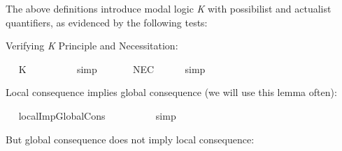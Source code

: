 \begin{isabellebody}
\isamarkuptrue%
%
\begin{isamarkuptext}%
The above definitions introduce modal logic \emph{K} with possibilist and actualist quantifiers,
as evidenced by the following tests:%
\end{isamarkuptext}\isamarkuptrue%
%
\begin{isamarkuptext}%
Verifying \emph{K} Principle and Necessitation:%
\end{isamarkuptext}\isamarkuptrue%
\ \isamarkupfalse%
\ K{\isacharcolon}\ {\isachardoublequoteopen}{\isasymlfloor}{\isacharparenleft}\isactrlbold {\isasymbox}{\isacharparenleft}{\isasymphi}\ \isactrlbold {\isasymrightarrow}\ {\isasympsi}{\isacharparenright}{\isacharparenright}\ \isactrlbold {\isasymrightarrow}\ {\isacharparenleft}\isactrlbold {\isasymbox}{\isasymphi}\ \isactrlbold {\isasymrightarrow}\ \isactrlbold {\isasymbox}{\isasympsi}{\isacharparenright}{\isasymrfloor}{\isachardoublequoteclose}%
\isadelimproof
\ %
\endisadelimproof
%
\isatagproof
{}\isamarkupfalse%
\ simp\ \ \ \ %
%
\endisatagproof
{\isafoldproof}%
%
\isadelimproof
%
\endisadelimproof
\isanewline
\ \isamarkupfalse%
\ NEC{\isacharcolon}\ {\isachardoublequoteopen}{\isasymlfloor}{\isasymphi}{\isasymrfloor}\ {\isasymLongrightarrow}\ {\isasymlfloor}\isactrlbold {\isasymbox}{\isasymphi}{\isasymrfloor}{\isachardoublequoteclose}%
\isadelimproof
\ %
\endisadelimproof
%
\isatagproof
{}\isamarkupfalse%
\ simp\ \ \ \ %
%
\endisatagproof
{\isafoldproof}%
%
\isadelimproof
%
\endisadelimproof
%
\begin{isamarkuptext}%
Local consequence implies global consequence (we will use this lemma often):%
\end{isamarkuptext}\isamarkuptrue%
\ \isamarkupfalse%
\ localImpGlobalCons{\isacharcolon}\ {\isachardoublequoteopen}{\isasymlfloor}{\isasymphi}\ \isactrlbold {\isasymrightarrow}\ {\isasymxi}{\isasymrfloor}\ {\isasymLongrightarrow}\ {\isasymlfloor}{\isasymphi}{\isasymrfloor}\ {\isasymlongrightarrow}\ {\isasymlfloor}{\isasymxi}{\isasymrfloor}{\isachardoublequoteclose}%
\isadelimproof
\ %
\endisadelimproof
%
\isatagproof
{}\isamarkupfalse%
\ simp%
\endisatagproof
{\isafoldproof}%
%
\isadelimproof
%
\endisadelimproof
%
\begin{isamarkuptext}%
But global consequence does not imply local consequence:%
\end{isamarkuptext}\isamarkuptrue%

\end{isabellebody}
